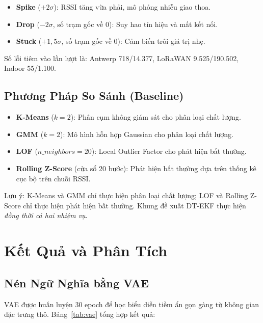 \documentclass[12pt,a4paper]{article}
\begin{document}
\begin{itemize}
    \item \textbf{Spike} ($+2\sigma$): RSSI tăng vừa phải, mô phỏng nhiễu giao thoa.
    \item \textbf{Drop} ($-2\sigma$, số trạm gốc về 0): Suy hao tín hiệu và mất kết nối.
    \item \textbf{Stuck} ($+1{,}5\sigma$, số trạm gốc về 0): Cảm biến trôi giá trị nhẹ.
\end{itemize}

Số lỗi tiêm vào lần lượt là: Antwerp 718/14.377, LoRaWAN 9.525/190.502,
Indoor 55/1.100.

\subsection{Phương Pháp So Sánh (Baseline)}

\begin{itemize}
    \item \textbf{K-Means} ($k=2$): Phân cụm không giám sát cho phân loại chất lượng.
    \item \textbf{GMM} ($k=2$): Mô hình hỗn hợp Gaussian cho phân loại chất lượng.
    \item \textbf{LOF} ($n\_neighbors=20$): Local Outlier Factor cho phát hiện bất thường.
    \item \textbf{Rolling Z-Score} (cửa sổ 20 bước): Phát hiện bất thường dựa trên
    thống kê cục bộ trên chuỗi RSSI.
\end{itemize}

Lưu ý: K-Means và GMM chỉ thực hiện phân loại chất lượng; LOF và Rolling
Z-Score chỉ thực hiện phát hiện bất thường. Khung đề xuất DT-EKF thực hiện
\textit{đồng thời cả hai nhiệm vụ}.

\section{Kết Quả và Phân Tích}

\subsection{Nén Ngữ Nghĩa bằng VAE}

VAE được huấn luyện 30 epoch để học biểu diễn tiềm ẩn gọn gàng từ không gian
đặc trưng thô. Bảng~\ref{tab:vae} tổng hợp kết quả:
\end{document}
